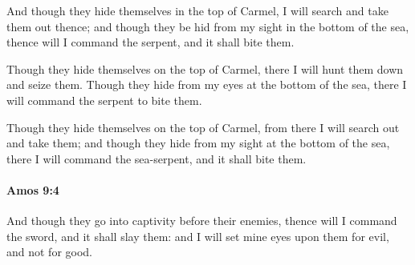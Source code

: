 			\begin{versebox}
					\item[BHS] 
					\item[LXX] 
					\item[ASV] And though they hide themselves in the top of Carmel, I will search and take them out thence; and though they be hid from my sight in the bottom of the sea, thence will I command the serpent, and it shall bite them.
					\item[NIV] Though they hide themselves on the top of Carmel, there I will hunt them down and seize them. Though they hide from my eyes at the bottom of the sea, there I will command the serpent to bite them.
					\item[NRSV] Though they hide themselves on the top of Carmel, from there I will search out and take them; and though they hide from my sight at the bottom of the sea, there I will command the sea-serpent, and it shall bite them.
			\end{versebox}

		\paragraph{Amos 9:4} %
			\label{AMOS-9-4}

			And though they go into captivity before their enemies, thence will I command the sword, and it shall slay them: and I will set mine eyes upon them for evil, and not for good.

